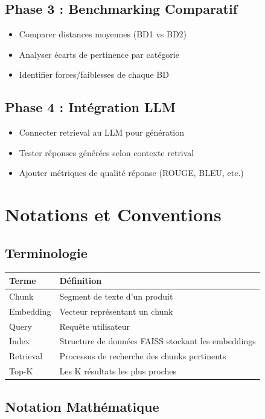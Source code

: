 \documentclass[12pt,a4paper]{article}
\begin{document}
\subsection{Phase 3 : Benchmarking Comparatif}
\begin{itemize}
    \item Comparer distances moyennes (BD1 vs BD2)
    \item Analyser écarts de pertinence par catégorie
    \item Identifier forces/faiblesses de chaque BD
\end{itemize}

\subsection{Phase 4 : Intégration LLM}
\begin{itemize}
    \item Connecter retrieval au LLM pour génération
    \item Tester réponses générées selon contexte retrival
    \item Ajouter métriques de qualité réponse (ROUGE, BLEU, etc.)
\end{itemize}

\section{Notations et Conventions}

\subsection{Terminologie}

\begin{tabular}{|l|l|}
\hline
\textbf{Terme} & \textbf{Définition} \\
\hline
Chunk & Segment de texte d'un produit \\
Embedding & Vecteur représentant un chunk \\
Query & Requête utilisateur \\
Index & Structure de données FAISS stockant les embeddings \\
Retrieval & Processus de recherche des chunks pertinents \\
Top-K & Les K résultats les plus proches \\
\hline
\end{tabular}

\subsection{Notation Mathématique}
\end{document}

